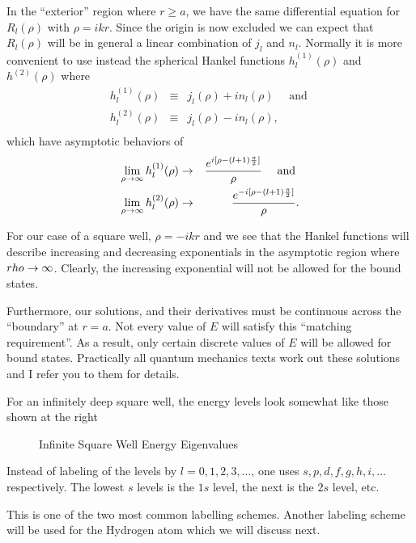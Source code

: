 In the ``exterior'' region where $r\ge a$, we have the same differential equation for $R_l(\rho)$ with $\rho = i k r$. Since the origin is now excluded we can expect that $R_l(\rho)$ will be in general a linear combination of $j_l$ and $n_l$. 
Normally it is more convenient to use instead the spherical Hankel functions $h^{(1)}_l(\rho)$ and $h^{(2)}(\rho)$ where 
\begin{eqnarray*}
h^{(1)}_l(\rho) &\equiv& j_l(\rho) + i  n_l(\rho) \mbox{  ~~ and }\\
h^{(2)}_l(\rho) &\equiv& j_l(\rho) - i  n_l(\rho),\\
\end{eqnarray*}
which have asymptotic behaviors of 
\begin{eqnarray*}
\lim_{\rho\rightarrow\infty} h^{(1)}_l(\rho) &\rightarrow& {e^{i[\rho-(l+1) {\pi\over2} ]} \over \rho} \mbox{  ~~ and }\\
\lim_{\rho\rightarrow\infty} h^{(2)}_l(\rho) &\rightarrow& {e^{-i[\rho-(l+1){\pi\over2} ]} \over \rho}.
\end{eqnarray*}

For our case of a square well, $\rho = -ikr$ and we see that the Hankel functions will describe increasing and decreasing exponentials in the asymptotic region where $rho \rightarrow \infty$. Clearly, the increasing exponential will not be 
allowed for the bound states. 

Furthermore, our solutions, and their derivatives must be continuous across the ``boundary'' at $r = a$. Not every value of $E$ will satisfy this ``matching requirement''. As a result, only certain discrete values of $E$ will be 
allowed for bound states. Practically all quantum mechanics texts work out these solutions and I refer you to them for details. 

For an infinitely deep square well, the energy levels look somewhat like those shown at the right
\begin{figure}[h]
\centering
\caption{Infinite Square Well Energy Eigenvalues}
\label{fig:InfiniteSquareWell}
\end{figure}
Instead of labeling of the levels by $l = 0,1,2,3,\hdots$, one uses $s, p, d, f, g, h, i, \hdots$ respectively. The lowest $s$ levels is the $1s$ level, the next is the $2s$ level, etc.

This is one of the two most common labelling schemes. Another labeling scheme will be used for the Hydrogen atom which we will discuss next. 

